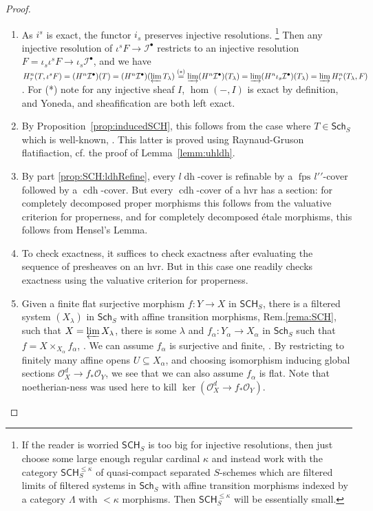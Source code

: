 \documentclass[10pt]{amsart}
\theoremstyle{definition}
\newcommand{\OO}{\mathcal{O}}
\newcommand{\Sch}{\mathsf{Sch}}
\newcommand{\SCH}{\mathsf{SCH}}
\newcommand{\fpsl}{{\operatorname{fps\!}l'}}
\newcommand{\cdh}{{{\operatorname{cdh}}}}
\newcommand{\ldh}{{l{\operatorname{dh}}}}
\begin{document}
\begin{proof}
\begin{enumerate}
 \item As $i^s$ is exact, the functor $i_s$ preserves injective resolutions.%
 \footnote{If the reader is worried $\SCH_S$ is too big for injective resolutions, then just choose some large enough regular cardinal $\kappa$ and instead work with the category $\SCH_S^{\leq \kappa}$ of quasi-compact separated $S$-schemes which are filtered limits of filtered systems in $\Sch_S$ with affine transition morphisms indexed by a category $\Lambda$ with $< \kappa$ morphisms. Then $\SCH_S^{\leq \kappa}$ will be essentially small.
 } %
Then any injective resolution of $\iota^sF \to \mathcal{I}^\bullet$ restricts to an injective resolution $F = \iota_s\iota^s F \to \iota_s\mathcal{I}^\bullet$, and we have $H^n_\tau(T, \iota^sF) 
= (H^n\mathcal{I}^\bullet)(T) 
= (H^n\mathcal{I}^\bullet)(\varprojlim T_\lambda) 
\stackrel{(*)}{=} \varinjlim (H^n\mathcal{I}^\bullet)(T_\lambda) 
= \varinjlim (H^n\iota_s\mathcal{I}^\bullet)(T_\lambda) 
= \varinjlim H^n_\tau(T_\lambda, F)$. For (*) note for any injective sheaf $I$, $\hom(-, I)$ is exact by definition, and Yoneda, and sheafification are both left exact.

 \item By Proposition~\ref{prop:inducedSCH}, this follows from the case where $T \in \Sch_S$ which is well-known, \cite[Prop.2.1.12(iii)]{Kel17}. This latter is proved using Raynaud-Gruson flatifiaction, cf. the proof of Lemma~\ref{lemm:uhldh}.
 
 \item By part \eqref{prop:SCH:ldhRefine}, every $\ldh$-cover is refinable by a $\fpsl'$-cover followed by a $\cdh$-cover. But every $\cdh$-cover of a hvr has a section: for completely decomposed proper morphisms this follows from the valuative criterion for properness, and for completely decomposed étale morphisms, this follows from Hensel's Lemma.
 
 \item To check exactness, it suffices to check exactness after evaluating the sequence of presheaves on an hvr. But in this case one readily checks exactness using the valuative criterion for properness.
 
 \item Given a finite flat surjective morphism $f: Y \to X$ in $\SCH_S$, there is a filtered system $(X_\lambda)$ in $\Sch_S$ with affine transition morphisms, Rem.\ref{rema:SCH}, such that $X = \varprojlim X_\lambda$, there is some $\lambda$ and $f_\alpha: Y_\alpha \to X_\alpha$ in $\Sch_S$ such that $f = X \times_{X_\alpha} f_\alpha$, \cite[Thm.8.8.2(ii)]{EGAIV3}. We can assume $f_\alpha$ is surjective and finite, \cite[Thm.8.10.5]{EGAIV3}. By restricting to finitely many affine opens $U \subseteq X_\alpha$, and choosing isomorphism inducing global sections $\OO_X^d \to f_*\OO_Y$, we see that we can also assume $f_\alpha$ is flat. Note that noetherian-ness was used here to kill $\ker(\OO_X^d \to f_* \OO_Y)$.
 

\end{enumerate}
\end{proof}
\end{document}
